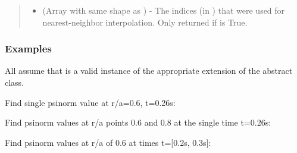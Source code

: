\documentclass[letterpaper,10pt,english]{sphinxmanual}
\begin{document}
\begin{fulllineitems}
\begin{fulllineitems}
\begin{quote}
\begin{description}
\begin{itemize}
\item {} 
 (Array with same shape as ) - The indices
(in ) that were used for
nearest-neighbor interpolation. Only returned if  is
True.

\end{itemize}


\end{description}\end{quote}
\subsubsection*{Examples}

All assume that  is a valid instance of the appropriate
extension of the {\hyperref[\detokenize{eqtools:eqtools.core.Equilibrium}]{}} abstract class.

Find single psinorm value at r/a=0.6, t=0.26s:

\begin{sphinxVerbatim}[commandchars=\\\{\}]
    
\end{sphinxVerbatim}

Find psinorm values at r/a points 0.6 and 0.8 at the
single time t=0.26s:

\begin{sphinxVerbatim}[commandchars=\\\{\}]
   \PYG{p}{[} \PYG{p}{]} 
\end{sphinxVerbatim}

Find psinorm values at r/a of 0.6 at times t={[}0.2s, 0.3s{]}:

\begin{sphinxVerbatim}[commandchars=\\\{\}]
    \PYG{p}{[} \PYG{p}{]}
\end{sphinxVerbatim}


\end{fulllineitems}
\end{fulllineitems}
\end{document}

